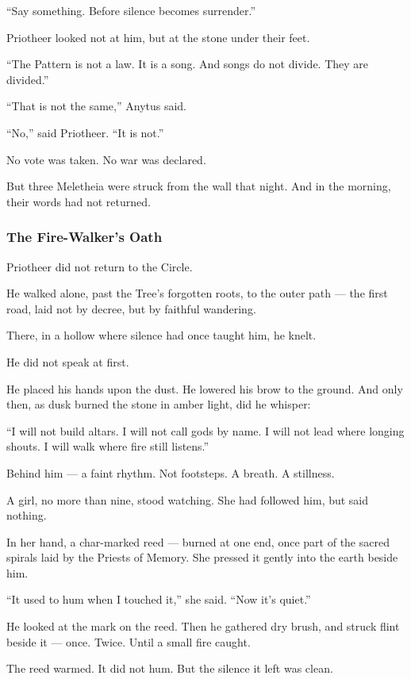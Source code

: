 \documentclass[12pt]{article}
\begin{document}
 “Say something. Before silence becomes surrender.”

Priotheer looked not at him,  
but at the stone under their feet.

 “The Pattern is not a law.  
 It is a song.  
 And songs do not divide.  
 They are divided.”

 “That is not the same,” Anytus said.

 “No,” said Priotheer. “It is not.”

No vote was taken.  
No war was declared.

But three Meletheia were struck from the wall that night.  
And in the morning, their words had not returned.

\dotfill

\subsubsection*{The Fire-Walker's Oath}

Priotheer did not return to the Circle.

He walked alone, past the Tree’s forgotten roots,  
to the outer path — the first road, laid not by decree, but by faithful wandering.

There, in a hollow where silence had once taught him, he knelt.

He did not speak at first.

He placed his hands upon the dust.  
He lowered his brow to the ground.  
And only then, as dusk burned the stone in amber light, did he whisper:

 “I will not build altars.  
 I will not call gods by name.  
 I will not lead where longing shouts.  
 I will walk where fire still listens.”

Behind him — a faint rhythm.  
Not footsteps. A breath. A stillness.

A girl, no more than nine, stood watching.  
She had followed him, but said nothing.

In her hand, a char-marked reed — burned at one end,  
once part of the sacred spirals laid by the Priests of Memory.  
She pressed it gently into the earth beside him.

 “It used to hum when I touched it,” she said.  
 “Now it’s quiet.”

He looked at the mark on the reed.  
Then he gathered dry brush,  
and struck flint beside it —  
once.  
Twice.  
Until a small fire caught.

The reed warmed.  
It did not hum.  
But the silence it left was clean.
\end{document}
